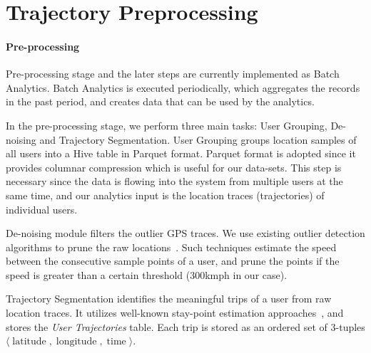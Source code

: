 \section{Trajectory Preprocessing}

\paragraph{Pre-processing}
\label{sec:preprocess}
Pre-processing stage and the later steps are currently implemented as Batch Analytics. Batch Analytics is executed periodically, which aggregates the records in the past period, and creates data that can be used by the analytics.

In the pre-processing stage, we perform three main tasks: User Grouping, De-noising and Trajectory Segmentation. User Grouping groups location samples of all users into a Hive table in Parquet format. Parquet format is adopted since it provides columnar compression which is useful for our data-sets. This step is necessary since the data is flowing into the system from multiple users at the same time, and our analytics input is the location traces (trajectories) of individual users.

De-noising module filters the outlier GPS traces. We use existing outlier detection algorithms to prune the raw locations~\cite{Yuan2013,Zheng2009}. Such techniques estimate the speed between the consecutive sample points of a user, and prune the points if the speed is greater than a certain threshold (\unit{300}{kmph} in our case).

Trajectory Segmentation identifies the meaningful trips of a user from raw location traces. It utilizes well-known stay-point estimation approaches~\cite{trajcut3}, and stores the \textit{User Trajectories} table. Each trip is stored as an ordered set of 3-tuples $\langle \operatorname{latitude},\operatorname{longitude}, \operatorname{time} \rangle$.
